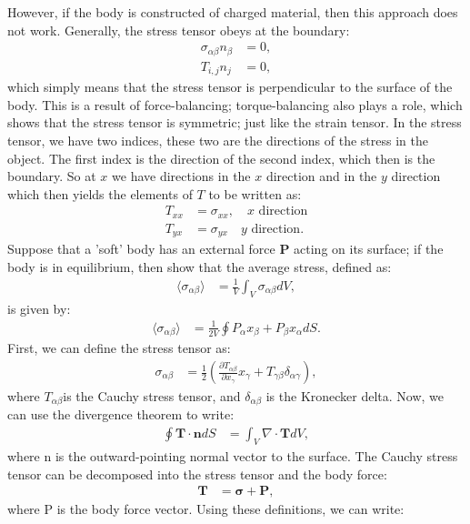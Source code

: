 \documentclass[a4paper]{article}
\begin{document}
However, if the body is constructed of charged material, then this approach does not work. Generally, the stress tensor obeys at the boundary:
\begin{align*}
    \sigma_{\alpha\beta}n_\beta &= 0,\\
    T_{i,j}n_j &= 0,
\end{align*}which simply means that the stress tensor is perpendicular to the surface of the body. This is a result of force-balancing; torque-balancing also plays a role, which shows that the stress tensor is symmetric; just like the strain tensor.
In the stress tensor, we have two indices, these two are the directions of the stress in the object. The first index is the direction of the second index, which then is the boundary. So at $x$ we have directions in the $x$ direction and in the $y$ direction which then yields the elements of $T$ to be written as:
\begin{align*}
    T_{xx} &= \sigma_{xx},\quad \text{$x$ direction}\\
    T_{yx} &= \sigma_{yx}\quad \text{$y$ direction}.
\end{align*}Suppose that a 'soft' body has an external force $\mathbf{P}$ acting on its surface; if the body is in equilibrium, then show that the average stress, defined as:
\begin{align*}
    \langle\sigma_{\alpha\beta}\rangle &=\frac{1}{V}\int_V \sigma_{\alpha\beta}dV,
\end{align*}is given by:
\begin{align*}
    \langle\sigma_{\alpha\beta}\rangle &= \frac{1}{2V}\oint P_\alpha x_\beta + P_\beta x_\alpha dS.
\end{align*}First, we can define the stress tensor as:
\begin{align*}
  \sigma_{\alpha\beta} &= \frac{1}{2}\left(\frac{\partial T_{\alpha\beta}}{\partial x_\gamma} x_\gamma + T_{\gamma\beta}\delta_{\alpha\gamma}\right),
\end{align*}where $T_{\alpha\beta}$is the Cauchy stress tensor, and $\delta_{\alpha\beta}$ is the Kronecker delta. Now, we can use the divergence theorem to write:
\begin{align*}
  \oint \mathbf{T} \cdot \mathbf{n} dS &= \int_V \nabla \cdot \mathbf{T} dV,
\end{align*}where n is the outward-pointing normal vector to the surface. The Cauchy stress tensor can be decomposed into the stress tensor and the body force:
\begin{align*}
  \mathbf{T} &= \mathbf{\sigma} + \mathbf{P},
\end{align*}where P is the body force vector. Using these definitions, we can write:
\end{document}
